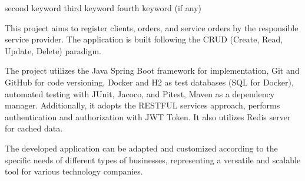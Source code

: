 {second keyword}
{third keyword}
{fourth keyword (if any)}




This project aims to register clients, orders, and service orders by the responsible service provider. The application is built following the CRUD (Create, Read, Update, Delete) paradigm.

The project utilizes the Java Spring Boot framework for implementation, Git and GitHub for code versioning, Docker and H2 as test databases (SQL for Docker), automated testing with JUnit, Jacoco, and Pitest, Maven as a dependency manager. Additionally, it adopts the RESTFUL services approach, performs authentication and authorization with JWT Token. It also utilizes Redis server for cached data.

The developed application can be adapted and customized according to the specific needs of different types of businesses, representing a versatile and scalable tool for various technology companies.\\

\printkeys %

